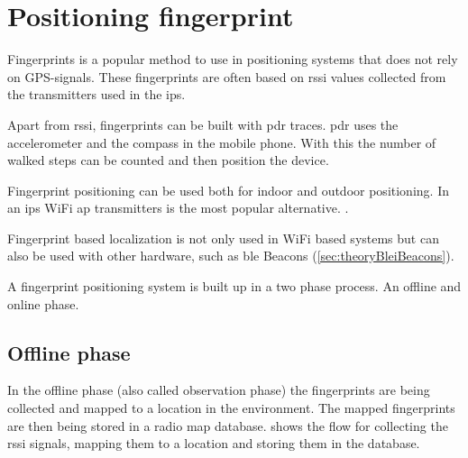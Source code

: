 \section{Positioning fingerprint}\label{sec:theoryFingerprint}
Fingerprints is a popular method to use in positioning systems that does not rely on GPS-signals.
These fingerprints are often based on \acrshort{rssi} values collected from the transmitters used in the \acrfull{ips}.
\cite{LocationFingerprintingInfrastructure2004, AutomaticConstructionRadio2018}

\bigskip

Apart from \acrshort{rssi}, fingerprints can be built with \acrfull{pdr} traces.
\acrshort{pdr} uses the accelerometer and the compass in the mobile phone.
With this the number of walked steps can be counted and then position the device.
\cite{AutomaticConstructionRadio2018, NoNeedWardrive2012}

\bigskip

Fingerprint positioning can be used both for indoor and outdoor positioning.
In an \acrshort{ips} WiFi \acrfull{ap} transmitters is the most popular alternative.
\cite{LocationFingerprintingInfrastructure2004,
IndoorFingerprintPositioning2017}.

\bigskip

Fingerprint based localization is not only used in WiFi based systems but can
also be used with other hardware, such as \acrlong{ble} Beacons (\cref{sec:theoryBleiBeacons}).
\cite{PracticalFingerprintingLocalization2017} 

\bigskip

A fingerprint positioning system is built up in a two phase process.  An offline
and online phase.\cite{IndoorFingerprintPositioning2017} 


\subsection{Offline phase}\label{sec:theoryFingerprintOffline}
In the offline phase (also called observation phase) the fingerprints are being collected and
mapped to a location in the environment.
The mapped fingerprints are then being stored in a radio map database.
 shows the flow for collecting the \acrshort{rssi} signals, mapping them to a location and storing them in the database.
\cite{IndoorFingerprintPositioning2017} 



